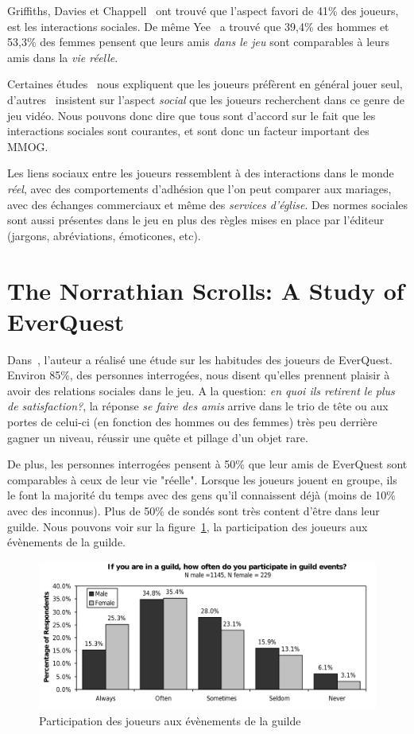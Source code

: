 \documentclass[11pt,a4paper]{article}
\begin{document}
Griffiths, Davies et Chappell~\cite{BreakingSteretype} ont trouvé que l'aspect favori de 41\% des joueurs, est les interactions sociales. De même Yee~\cite{1159988} a trouvé que 39,4\% des hommes et 53,3\% des femmes pensent que leurs amis \textit{dans le jeu} sont comparables à leurs amis dans la \textit{vie réelle}.
\par Certaines études~\cite{1124834,1031667} nous expliquent que les joueurs préfèrent en général jouer seul, d'autres~\cite{1159988,Jakobsson03thesopranos} insistent sur l'aspect \textit{social} que les joueurs recherchent dans ce genre de jeu vidéo. Nous pouvons donc dire que tous sont d'accord sur le fait que les interactions sociales sont courantes, et sont donc un facteur important des MMOG.
\par Les liens sociaux entre les joueurs ressemblent à des interactions dans le monde \textit{réel}, avec des comportements d'adhésion que l'on peut comparer aux mariages, avec des échanges commerciaux et même des \textit{services d'église}. Des normes sociales sont aussi présentes dans le jeu en plus des règles mises en place par l'éditeur (jargons, abréviations, émoticones, etc).

\section{The Norrathian Scrolls: A Study of EverQuest}
Dans~\cite{StudyEQ}, l'auteur a réalisé une étude sur les habitudes des joueurs de EverQuest. Environ 85\%, des personnes interrogées, nous disent qu'elles prennent plaisir à avoir des relations sociales dans le jeu. A la question: \textit{en quoi ils retirent le plus de satisfaction?}, la réponse \textit{se faire des amis} arrive dans le trio de tête ou aux portes de celui-ci (en fonction des hommes ou des femmes) très peu derrière gagner un niveau, réussir une quête et pillage d'un objet rare.
\par De plus, les personnes interrogées pensent à 50\% que leur amis de EverQuest sont comparables à ceux de leur vie "réelle". Lorsque les joueurs jouent en groupe, ils le font la majorité du temps avec des gens qu'il connaissent déjà (moins de 10\% avec des inconnus). Plus de 50\% de sondés sont très content d'être dans leur guilde. Nous pouvons voir sur la figure~\ref{guildpres}, la participation des joueurs aux évènements de la guilde.
        \begin{figure}[!h]
        \centering
        \includegraphics[scale=0.75]{./images/studypres.png}
        \caption{Participation des joueurs aux évènements de la guilde}
        \label{guildpres}
        \end{figure}
\end{document}
